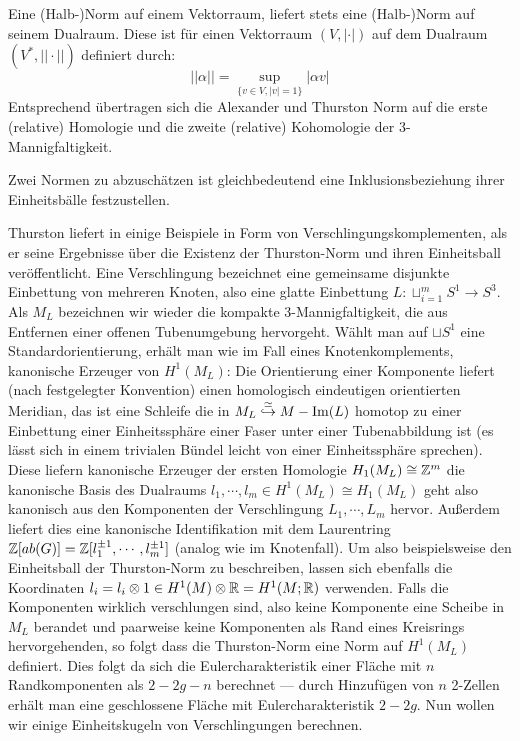        \begin{bsp}
        Eine (Halb-)Norm auf einem Vektorraum, liefert stets eine (Halb-)Norm auf seinem Dualraum. Diese ist für einen Vektorraum $(V,|\cdot|)$ auf dem Dualraum $(V^*,||\cdot||)$ definiert durch:
        \[
             ||\alpha||= \sup_{\{v\in V, |v|=1\}} |\alpha v|
         \] 
         Entsprechend übertragen sich die Alexander und Thurston Norm auf die erste (relative) Homologie und die zweite (relative) Kohomologie der 3-Mannigfaltigkeit. 
    \end{bsp}
    \begin{bem}
        Zwei Normen zu abzuschätzen ist gleichbedeutend eine Inklusionsbeziehung ihrer Einheitsbälle festzustellen. 
    \end{bem}
    \begin{bsp}[Verschlingungen]
    \label{ex:links}
        Thurston liefert in \cite{Thurston.1986} einige Beispiele in Form von Verschlingungskomplementen, als er seine Ergebnisse über die Existenz der Thurston-Norm und ihren Einheitsball veröffentlicht. Eine Verschlingung bezeichnet eine gemeinsame disjunkte Einbettung von mehreren Knoten, also eine glatte Einbettung $L: \sqcup_{i=1}^m S^1 \to S^3$. Als $M_L$ bezeichnen wir wieder die kompakte 3-Mannigfaltigkeit, die aus Entfernen einer offenen Tubenumgebung hervorgeht. Wählt man auf $\sqcup S^1$ eine Standardorientierung, erhält man wie im Fall eines Knotenkomplements, kanonische Erzeuger von $H^1(M_L)$: Die Orientierung einer Komponente liefert (nach festgelegter Konvention) einen homologisch eindeutigen orientierten Meridian, das ist eine Schleife die in $M_L\stackrel \simeq {\hookrightarrow} M - \operatorname{Im}(L)$ homotop zu einer Einbettung einer Einheitssphäre einer Faser unter einer Tubenabbildung ist (es lässt sich in einem trivialen Bündel leicht von einer Einheitssphäre sprechen). Diese liefern kanonische Erzeuger der ersten Homologie $H_1(M_L) \cong \mathbb{Z}^m$ die kanonische Basis des Dualraums $l_1,\cdots,l_m \in H^1(M_L)\cong H_1(M_L)$ geht also kanonisch aus den Komponenten der Verschlingung $L_1,\cdots,L_m$ hervor. Außerdem liefert dies eine kanonische Identifikation mit dem Laurentring $\mathbb{Z}[ab(G)]=\mathbb{Z}[l_1^{\pm 1},\cdots,l_m^{\pm 1}]$ (analog wie im Knotenfall). Um also beispielsweise den Einheitsball der Thurston-Norm zu beschreiben, lassen sich ebenfalls die Koordinaten $l_i=l_i \otimes 1 \in H^1(M)\otimes \mathbb{R} = H^1(M;\mathbb{R})$ verwenden. Falls die Komponenten wirklich verschlungen sind, also keine Komponente eine Scheibe in $M_L$ berandet und paarweise keine Komponenten als Rand eines Kreisrings hervorgehenden, so folgt dass die Thurston-Norm eine Norm auf $H^1(M_L)$ definiert. Dies folgt da sich die Eulercharakteristik einer Fläche mit $n$ Randkomponenten als $2-2g-n$ berechnet --- durch Hinzufügen von $n$ 2-Zellen erhält man eine geschlossene Fläche mit Eulercharakteristik $2-2g$. Nun wollen wir einige Einheitskugeln von Verschlingungen berechnen.
    \end{bsp}
       

